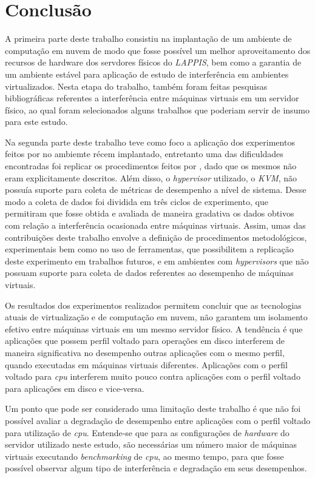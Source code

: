 \chapter{Conclusão}
\label{cap:conclusao}

A primeira parte deste trabalho consistiu na implantação de um ambiente de computação em nuvem de modo que fosse possível um melhor aproveitamento dos recursos de hardware dos servdores físicos do \textit{LAPPIS}, bem como a garantia de um ambiente estável para aplicação de estudo de interferência em ambientes virtualizados. Nesta etapa do trabalho, também foram feitas pesquisas bibliográficas referentes a interferência entre máquinas virtuais em um servidor físico, ao qual foram selecionados alguns trabalhos que poderiam servir de insumo para este estudo.

Na segunda parte deste trabalho teve como foco a aplicação dos experimentos feitos por  no ambiemte récem implantado, entretanto uma das dificuldades encontradas foi replicar os procedimentos feitos por , dado que os mesmos não eram explicitamente descritos. Além disso, o \textit{hypervisor} utilizado, o \textit{KVM}, não possuía suporte para coleta de métricas de desempenho a nível de sistema. Desse modo a coleta de dados foi dividida em três ciclos de experimento, que permitiram que fosse obtida e avaliada de maneira gradativa os dados obtivos com relação a interferência ocasionada entre máquinas virtuais. Assim, umas das contribuições deste trabalho envolve a definição de procedimentos metodológicos, experimentais bem como no uso de ferramentas, que possibilitem a replicação deste experimento em trabalhos futuros, e em ambientes com \textit{hypervisors} que não possuam suporte para coleta de dados referentes ao desempenho de máquinas virtuais.  %

Os resultados dos experimentos realizados permitem concluir que as tecnologias atuais de virtualização e de computação em nuvem, não garantem um isolamento efetivo entre máquinas virtuais em um mesmo servidor físico. A tendência é que aplicações que possem perfil voltado para operações em disco interferem de maneira significativa no desempenho outras aplicações  com o mesmo perfil, quando executadas em máquinas virtuais diferentes. Aplicações com o perfil voltado para \textit{cpu} interferem muito pouco contra aplicações com o perfil voltado para aplicações em disco e vice-versa.

Um ponto que pode ser considerado uma limitação deste trabalho é que não foi possível avaliar a degradação de desempenho entre aplicações com o perfil voltado para utilização de \textit{cpu}. Entende-se que para as configurações de \textit{hardware} do servidor utilizado neste estudo, são necessárias um número maior de máquinas virtuais executando \textit{benchmarking} de \textit{cpu}, ao mesmo tempo, para que fosse possível observar algum tipo de interferência e degradação em seus desempenhos.

